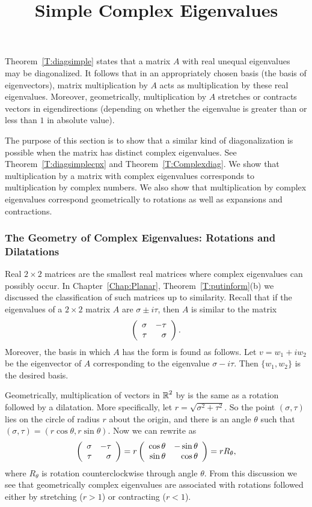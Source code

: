 \documentclass{ximera}
\title{Simple Complex Eigenvalues}
\begin{document}
\begin{abstract}
\end{abstract}
\maketitle

  \label{S:CSE}

Theorem~\ref{T:diagsimple} states that a matrix $A$ with real
unequal eigenvalues may be diagonalized. It follows that 
in an appropriately chosen basis (the basis of eigenvectors), 
matrix multiplication by $A$ acts 
as multiplication by these real eigenvalues.  Moreover, geometrically, 
multiplication by $A$ stretches or contracts vectors in 
eigendirections (depending on whether the eigenvalue is greater
than or less than $1$ in absolute value).

The purpose of this section is to show that a similar kind of diagonalization 
is possible when the matrix has distinct complex eigenvalues. See
Theorem~\ref{T:diagsimplecpx} and Theorem~\ref{T:Complexdiag}.  We show 
that multiplication by a matrix with complex eigenvalues corresponds
to multiplication by complex numbers.  We also show that multiplication by 
complex eigenvalues correspond geometrically to rotations 
as well as expansions and contractions.

\subsubsection*{The Geometry of Complex Eigenvalues: Rotations and
Dilatations}

Real $2\times 2$ matrices are the smallest real matrices where complex 
eigenvalues can possibly occur.  In Chapter~\ref{Chap:Planar}, 
Theorem~\ref{T:putinform}(b) we discussed the classification of such matrices 
up to similarity.  Recall that if the eigenvalues of a $2\times 2$ matrix $A$ 
are $\sigma\pm i\tau$, 
then $A$ is similar to the matrix 
\begin{equation} \label{E:normalfm2}
\left(\begin{array}{rr} \sigma & -\tau\\ \tau &\sigma\end{array}\right).
\end{equation}
Moreover, the basis in which $A$ has the form  is found
as follows.  Let $v=w_1+iw_2$ be the eigenvector of $A$ corresponding to 
the eigenvalue $\sigma-i\tau$.  Then $\{w_1,w_2\}$ is the desired 
basis.

Geometrically, multiplication of vectors in $\mbox{$\Bbb{R}$}^2$ by  is 
the same as a rotation followed by a dilatation.  More 
specifically, let $r=\sqrt{\sigma^2+\tau^2}$.  So the point $(\sigma,\tau)$ 
lies on the circle of radius $r$ about the origin, and there is an angle 
$\theta$ such that $(\sigma,\tau)=(r\cos\theta,r\sin\theta)$.  Now we can 
rewrite  as
\[
\left(\begin{array}{rr} \sigma & -\tau\\ \tau &\sigma\end{array}\right)
= r\left(\begin{array}{rr} \cos\theta & -\sin{\theta}\\ \sin\theta &\cos\theta\end{array}\right)=rR_{\theta},
\]
where $R_\theta$ is rotation counterclockwise through angle $\theta$.  From 
this discussion we see that geometrically complex eigenvalues are associated 
with rotations followed either by stretching ($r>1$) or contracting ($r<1$).
\end{document}
